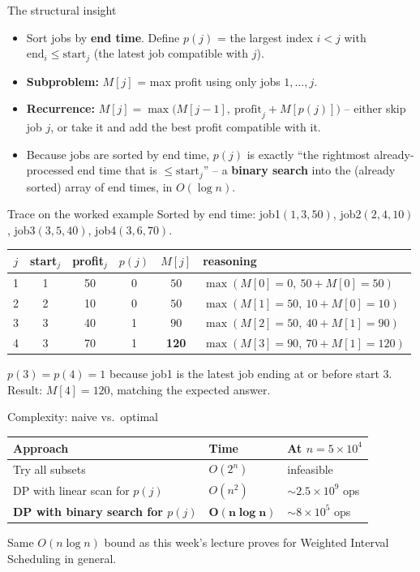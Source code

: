 \documentclass[11pt,aspectratio=169]{beamer}
\begin{document}
\begin{frame}{The structural insight}
  \begin{itemize}
    \item Sort jobs by \textbf{end time}. Define $p(j)$ = the largest index $i < j$
    with $\text{end}_i \le \text{start}_j$ (the latest job compatible with $j$).
    \item \textbf{Subproblem:} $M[j]$ = max profit using only jobs $1,\dots,j$.
    \item \textbf{Recurrence:} $M[j] = \max\big(M[j-1],\ \text{profit}_j + M[p(j)]\big)$
    -- either skip job $j$, or take it and add the best profit compatible with it.
    \item Because jobs are sorted by end time, $p(j)$ is exactly ``the rightmost
    already-processed end time that is $\le \text{start}_j$'' -- a \textbf{binary
    search} into the (already sorted) array of end times, in $O(\log n)$.
  \end{itemize}
\end{frame}

\begin{frame}{Trace on the worked example}
  \small
  Sorted by end time: job1$(1,3,50)$, job2$(2,4,10)$, job3$(3,5,40)$, job4$(3,6,70)$.
  \begin{center}
  \begin{tabular}{@{}cccccl@{}}
    \toprule
    $j$ & start$_j$ & profit$_j$ & $p(j)$ & $M[j]$ & reasoning \\
    \midrule
    1 & 1 & 50 & 0 & $50$ & $\max(M[0]{=}0,\ 50+M[0]{=}50)$ \\
    2 & 2 & 10 & 0 & $50$ & $\max(M[1]{=}50,\ 10+M[0]{=}10)$ \\
    3 & 3 & 40 & 1 & $90$ & $\max(M[2]{=}50,\ 40+M[1]{=}90)$ \\
    4 & 3 & 70 & 1 & \textbf{120} & $\max(M[3]{=}90,\ 70+M[1]{=}120)$ \\
    \bottomrule
  \end{tabular}
  \end{center}
  $p(3)=p(4)=1$ because job1 is the latest job ending at or before start $3$.
  Result: $M[4] = 120$, matching the expected answer.
\end{frame}

\begin{frame}{Complexity: naive vs.\ optimal}
  \begin{center}
  \begin{tabular}{@{}lll@{}}
    \toprule
    Approach & Time & At $n=5\times10^4$ \\
    \midrule
    Try all subsets & $O(2^n)$ & infeasible \\
    DP with linear scan for $p(j)$ & $O(n^2)$ & $\sim 2.5\times10^9$ ops \\
    \textbf{DP with binary search for $p(j)$} & $\boldsymbol{O(n\log n)}$ &
    $\sim 8\times10^5$ ops \\
    \bottomrule
  \end{tabular}
  \end{center}
  Same $O(n\log n)$ bound as this week's lecture proves for Weighted Interval
  Scheduling in general.
\end{frame}
\end{document}
